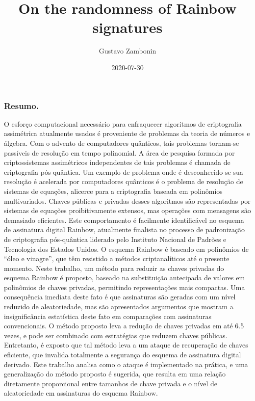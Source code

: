 \documentclass[12pt, a4paper, oneside]{memoir}
\title{On the randomness of Rainbow signatures}
\author{Gustavo Zambonin}
\date{2020-07-30}
\theoremstyle{definition}
\begin{document}
\maketitle

\subsubsection{Resumo.}

O esforço computacional necessário para enfraquecer algoritmos de criptografia assimétrica atualmente usados é proveniente de problemas da teoria de números e álgebra. Com o advento de computadores quânticos, tais problemas tornam-se passíveis de resolução em tempo polinomial. A área de pesquisa formada por criptossistemas assimétricos independentes de tais problemas é chamada de criptografia pós-quântica. Um exemplo de problema onde é desconhecido se sua resolução é acelerada por computadores quânticos é o problema de resolução de sistemas de equações, alicerce para a criptografia baseada em polinômios multivariados. Chaves públicas e privadas desses algoritmos são representadas por sistemas de equações proibitivamente extensos, mas operações com mensagens são demasiado eficientes. Este comportamento é facilmente identificável no esquema de assinatura digital Rainbow, atualmente finalista no processo de padronização de criptografia pós-quântica liderado pelo Instituto Nacional de Padrões e Tecnologia dos Estados Unidos. O esquema Rainbow é baseado em polinômios de ``óleo e vinagre'', que têm resistido a métodos criptanalíticos até o presente momento. Neste trabalho, um método para reduzir as chaves privadas do esquema Rainbow é proposto, baseado na substituição antecipada de valores em polinômios de chaves privadas, permitindo representações mais compactas. Uma consequência imediata deste fato é que assinaturas são geradas com um nível reduzido de aleatoriedade, mas são apresentados argumentos que mostram a insignificância estatística deste fato em comparações com assinaturas convencionais. O método proposto leva a redução de chaves privadas em até 6.5 vezes, e pode ser combinado com estratégias que reduzem chaves públicas. Entretanto, é exposto que tal método leva a um ataque de recuperação de chaves eficiente, que invalida totalmente a segurança do esquema de assinatura digital derivado. Este trabalho analisa como o ataque é implementado na prática, e uma generalização do método proposto é sugerida, que resulta em uma relação diretamente proporcional entre tamanhos de chave privada e o nível de aleatoriedade em assinaturas do esquema Rainbow.
\end{document}
